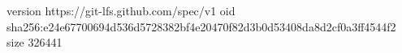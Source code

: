 version https://git-lfs.github.com/spec/v1
oid sha256:e24e67700694d536d5728382bf4e20470f82d3b0d53408da8d2cf0a3ff4544f2
size 326441
